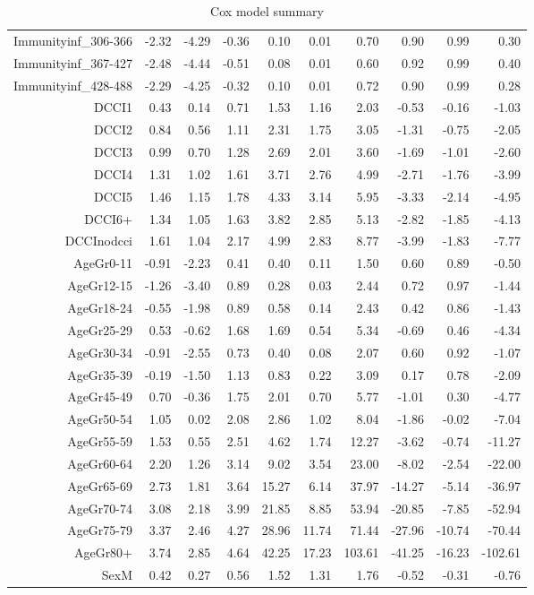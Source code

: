 \begin{table}[ht]
\begin{tabular}{rrrrrrrrrr}
  Immunityinf\_306-366 & -2.32 & -4.29 & -0.36 & 0.10 & 0.01 & 0.70 & 0.90 & 0.99 & 0.30 \\ 
  Immunityinf\_367-427 & -2.48 & -4.44 & -0.51 & 0.08 & 0.01 & 0.60 & 0.92 & 0.99 & 0.40 \\ 
  Immunityinf\_428-488 & -2.29 & -4.25 & -0.32 & 0.10 & 0.01 & 0.72 & 0.90 & 0.99 & 0.28 \\ 
  DCCI1 & 0.43 & 0.14 & 0.71 & 1.53 & 1.16 & 2.03 & -0.53 & -0.16 & -1.03 \\ 
  DCCI2 & 0.84 & 0.56 & 1.11 & 2.31 & 1.75 & 3.05 & -1.31 & -0.75 & -2.05 \\ 
  DCCI3 & 0.99 & 0.70 & 1.28 & 2.69 & 2.01 & 3.60 & -1.69 & -1.01 & -2.60 \\ 
  DCCI4 & 1.31 & 1.02 & 1.61 & 3.71 & 2.76 & 4.99 & -2.71 & -1.76 & -3.99 \\ 
  DCCI5 & 1.46 & 1.15 & 1.78 & 4.33 & 3.14 & 5.95 & -3.33 & -2.14 & -4.95 \\ 
  DCCI6+ & 1.34 & 1.05 & 1.63 & 3.82 & 2.85 & 5.13 & -2.82 & -1.85 & -4.13 \\ 
  DCCInodcci & 1.61 & 1.04 & 2.17 & 4.99 & 2.83 & 8.77 & -3.99 & -1.83 & -7.77 \\ 
  AgeGr0-11 & -0.91 & -2.23 & 0.41 & 0.40 & 0.11 & 1.50 & 0.60 & 0.89 & -0.50 \\ 
  AgeGr12-15 & -1.26 & -3.40 & 0.89 & 0.28 & 0.03 & 2.44 & 0.72 & 0.97 & -1.44 \\ 
  AgeGr18-24 & -0.55 & -1.98 & 0.89 & 0.58 & 0.14 & 2.43 & 0.42 & 0.86 & -1.43 \\ 
  AgeGr25-29 & 0.53 & -0.62 & 1.68 & 1.69 & 0.54 & 5.34 & -0.69 & 0.46 & -4.34 \\ 
  AgeGr30-34 & -0.91 & -2.55 & 0.73 & 0.40 & 0.08 & 2.07 & 0.60 & 0.92 & -1.07 \\ 
  AgeGr35-39 & -0.19 & -1.50 & 1.13 & 0.83 & 0.22 & 3.09 & 0.17 & 0.78 & -2.09 \\ 
  AgeGr45-49 & 0.70 & -0.36 & 1.75 & 2.01 & 0.70 & 5.77 & -1.01 & 0.30 & -4.77 \\ 
  AgeGr50-54 & 1.05 & 0.02 & 2.08 & 2.86 & 1.02 & 8.04 & -1.86 & -0.02 & -7.04 \\ 
  AgeGr55-59 & 1.53 & 0.55 & 2.51 & 4.62 & 1.74 & 12.27 & -3.62 & -0.74 & -11.27 \\ 
  AgeGr60-64 & 2.20 & 1.26 & 3.14 & 9.02 & 3.54 & 23.00 & -8.02 & -2.54 & -22.00 \\ 
  AgeGr65-69 & 2.73 & 1.81 & 3.64 & 15.27 & 6.14 & 37.97 & -14.27 & -5.14 & -36.97 \\ 
  AgeGr70-74 & 3.08 & 2.18 & 3.99 & 21.85 & 8.85 & 53.94 & -20.85 & -7.85 & -52.94 \\ 
  AgeGr75-79 & 3.37 & 2.46 & 4.27 & 28.96 & 11.74 & 71.44 & -27.96 & -10.74 & -70.44 \\ 
  AgeGr80+ & 3.74 & 2.85 & 4.64 & 42.25 & 17.23 & 103.61 & -41.25 & -16.23 & -102.61 \\ 
  SexM & 0.42 & 0.27 & 0.56 & 1.52 & 1.31 & 1.76 & -0.52 & -0.31 & -0.76 \\ 
   \hline
\end{tabular}
\caption{Cox model summary} 
\end{table}

